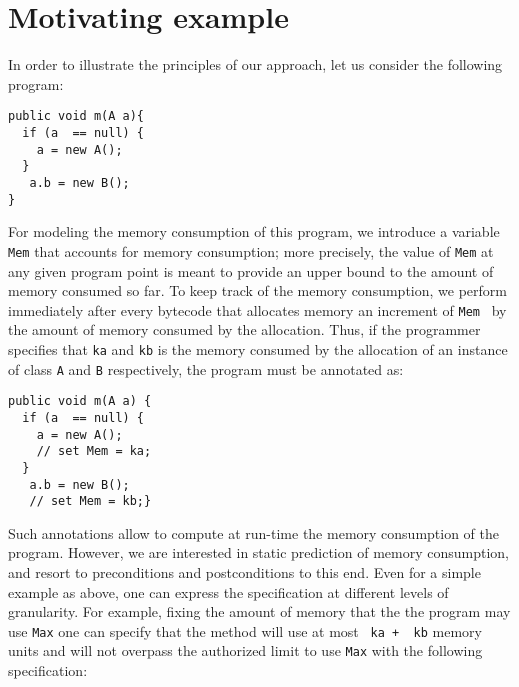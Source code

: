 \section{Motivating example}\label{sec:motivation}

In order to illustrate the principles of our approach, let us consider
the following program:

\begin{lstlisting}[frame=trbl] 
public void m(A a){
  if (a  == null) {
    a = new A();
  }  
   a.b = new B();
}
\end{lstlisting}

For modeling the memory consumption of this program, we introduce
a \ghost{}  variable \lstinline!Mem! that accounts for memory consumption; more
precisely, the value of \lstinline!Mem! at any given program point is meant
to provide an upper bound to the amount of memory consumed so far. To
keep track of the memory consumption, we perform immediately after every 
bytecode that allocates memory an increment of \lstinline!Mem! \ by the amount
of memory consumed by the allocation. Thus, if the programmer specifies
that \lstinline!ka! and \lstinline!kb! is the memory consumed by the allocation of 
an instance of class \lstinline!A! and  \lstinline!B! respectively, the program must
be annotated as:
\begin{lstlisting}[frame=trbl] 
public void m(A a) {
  if (a  == null) {
    a = new A();
    // set Mem = ka;
  }  
   a.b = new B();
   // set Mem = kb;}
\end{lstlisting}

Such annotations allow to compute at run-time the memory consumption of 
the program. However, we are interested in static prediction of memory
consumption, and resort to preconditions and postconditions to this end.
Even for a simple example as above, one can express the specification
at different levels of granularity. For example, fixing the amount of memory that
the the program may use \lstinline!Max! one can specify that the method will use at most 
\lstinline! ka +  kb! memory units and will not overpass the authorized limit to use \lstinline!Max! with the following specification:

